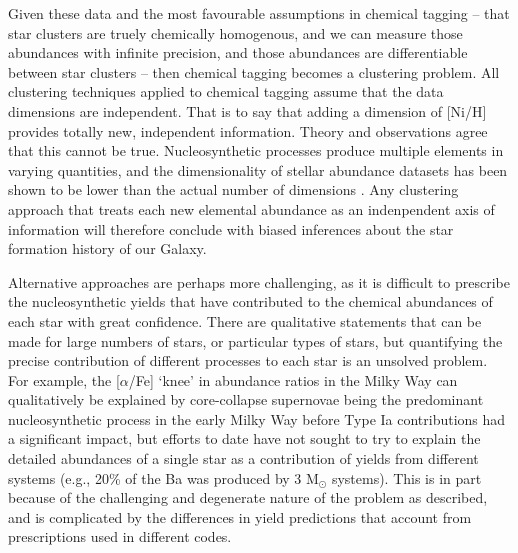 \documentclass[twocolumn]{aastex61}
\begin{document}
Given these data and the most
favourable assumptions in chemical tagging -- that star clusters are truely
chemically homogenous, and we can measure those abundances with infinite precision,
and those abundances are differentiable between star clusters -- then chemical
tagging becomes a clustering problem. All clustering techniques applied to 
chemical tagging assume that the data dimensions are independent. That is to say
that adding a dimension of [Ni/H] provides totally new, independent information.
Theory and observations agree that this cannot be true.
Nucleosynthetic processes produce multiple elements in varying
quantities, and the dimensionality of stellar abundance datasets has been shown
to be lower than the actual number of dimensions \citep{Ting:2012, Price-Jones:2018}.
Any clustering approach that treats each new elemental abundance as an 
indenpendent axis of information will therefore conclude with biased inferences
about the star formation history of our Galaxy. 


Alternative approaches are perhaps more challenging, as it is difficult to prescribe
the nucleosynthetic yields that have contributed to the chemical abundances of each star
with great confidence. There are
qualitative statements that can be made for large numbers of stars, or particular
types of stars, but quantifying the precise contribution of different processes
to each star is an unsolved problem. For example, the [$\alpha$/Fe] `knee' in
abundance ratios in the Milky Way can qualitatively be explained by 
core-collapse supernovae being the predominant nucleosynthetic process in the
early Milky Way before Type Ia contributions had a significant impact, but 
efforts to date have not sought to try to explain the detailed abundances of a 
single star as a contribution of yields from different systems (e.g., 20\% of the
Ba was produced by 3 M$_\odot$ systems). This is in part because of the
challenging and degenerate nature of the problem as described, and is complicated
by the differences in yield predictions that account from prescriptions used in
different codes.
\end{document}
